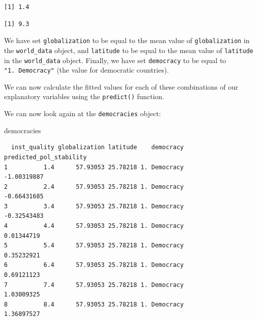 \documentclass[]{article}
\newenvironment{Shaded}{\begin{snugshade}}{\end{snugshade}}
\newcommand{\DataTypeTok}[1]{\textcolor[rgb]{0.13,0.29,0.53}{#1}}
\newcommand{\KeywordTok}[1]{\textcolor[rgb]{0.13,0.29,0.53}{\textbf{#1}}}
\newcommand{\NormalTok}[1]{#1}
\newcommand{\OperatorTok}[1]{\textcolor[rgb]{0.81,0.36,0.00}{\textbf{#1}}}
\newcommand{\StringTok}[1]{\textcolor[rgb]{0.31,0.60,0.02}{#1}}
\begin{document}
\begin{verbatim}
[1] 1.4
\end{verbatim}

\begin{Shaded}
\end{Shaded}

\begin{verbatim}
[1] 9.3
\end{verbatim}

We have set \texttt{globalization} to be equal to the mean value of \texttt{globalization} in the \texttt{world\_data} object, and \texttt{latitude} to be equal to the mean value of \texttt{latitude} in the \texttt{world\_data} object. Finally, we have set \texttt{democracy} to be equal to \texttt{"1.\ Democracy"} (the value for democratic countries).

We can now calculate the fitted values for each of these combinations of our explanatory variables using the \texttt{predict()} function.

\begin{Shaded}
\end{Shaded}

We can now look again at the \texttt{democracies} object:

\begin{Shaded}
\begin{Highlighting}[]
\NormalTok{democracies}
\end{Highlighting}
\end{Shaded}

\begin{verbatim}
  inst_quality globalization latitude    democracy predicted_pol_stability
1          1.4      57.93053 25.78218 1. Democracy             -1.00319887
2          2.4      57.93053 25.78218 1. Democracy             -0.66431685
3          3.4      57.93053 25.78218 1. Democracy             -0.32543483
4          4.4      57.93053 25.78218 1. Democracy              0.01344719
5          5.4      57.93053 25.78218 1. Democracy              0.35232921
6          6.4      57.93053 25.78218 1. Democracy              0.69121123
7          7.4      57.93053 25.78218 1. Democracy              1.03009325
8          8.4      57.93053 25.78218 1. Democracy              1.36897527
\end{verbatim}
\end{document}
